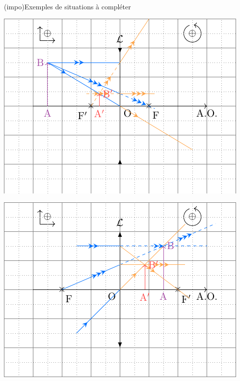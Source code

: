 \documentclass[../../main/main.tex]{subfiles}
\begin{document}
\begin{tcb}[label=impo:cons_exem](impo){Exemples de situations à compléter}
	\begin{minipage}{0.50\linewidth}
		\begin{center}
			\includegraphics[width=\linewidth]{lent_div-constru_simple}
			\label{fig:corrdivconstrusimple}
		\end{center}
	\end{minipage}
	\hfill
	\begin{minipage}{0.50\linewidth}
		\begin{center}
			\includegraphics[width=\linewidth]{lent_conv-constru_after}

\end{center}
\end{minipage}
\end{tcb}
\end{document}
